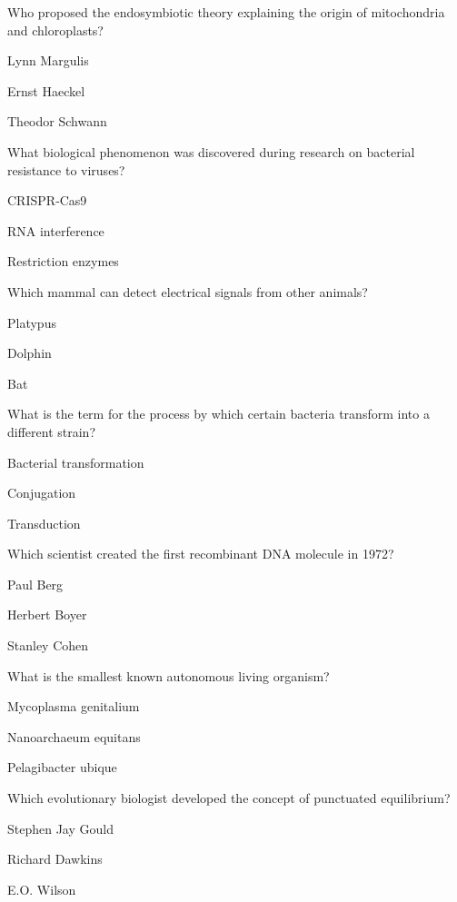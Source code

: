 \begin{enhancedmcq}{Who proposed the endosymbiotic theory explaining the origin of mitochondria and chloroplasts?}
\item Lynn Margulis
\item Ernst Haeckel
\item Theodor Schwann

\end{enhancedmcq}
\begin{enhancedmcq}{What biological phenomenon was discovered during research on bacterial resistance to viruses?}
\item CRISPR‑Cas9
\item RNA interference
\item Restriction enzymes

\end{enhancedmcq}
\begin{enhancedmcq}{Which mammal can detect electrical signals from other animals?}
\item Platypus
\item Dolphin
\item Bat

\end{enhancedmcq}
\begin{enhancedmcq}{What is the term for the process by which certain bacteria transform into a different strain?}
\item Bacterial transformation
\item Conjugation
\item Transduction

\end{enhancedmcq}
\begin{enhancedmcq}{Which scientist created the first recombinant DNA molecule in 1972?}
\item Paul Berg
\item Herbert Boyer
\item Stanley Cohen

\end{enhancedmcq}
\begin{enhancedmcq}{What is the smallest known autonomous living organism?}
\item Mycoplasma genitalium
\item Nanoarchaeum equitans
\item Pelagibacter ubique

\end{enhancedmcq}
\begin{enhancedmcq}{Which evolutionary biologist developed the concept of punctuated equilibrium?}
\item Stephen Jay Gould
\item Richard Dawkins
\item E.O. Wilson

\end{enhancedmcq}

